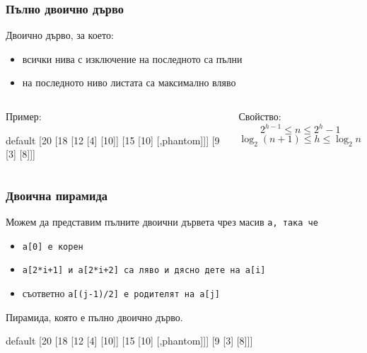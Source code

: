 \documentclass[alsotrans,beameroptions={aspectratio=169}]{beamerswitch}
\newcommand{\samplebinheap}{\begin{forest}
    default [20 [18 [12 [4] [10]] [15 [10] [,phantom]]] [9 [3] [8]]]
\end{forest}}
\begin{document}
\begin{frame}
  \frametitle{Пълно двоично дърво}

  \begin{definition}
    Двоично дърво, за което:
    \begin{itemize}
    \item всички нива с изключение на последното са пълни
    \item на последното ниво листата са максимално вляво
    \end{itemize}
  \end{definition}
  \pause
  \begin{columns}[t,onlytextwidth]
    \begin{column}{0.5\textwidth}
      Пример:\vspace{-3ex}
      \small
      \begin{center}
        \samplebinheap
      \end{center}
    \end{column}
    \begin{column}{0.5\textwidth}
      \pause
      Свойство:
      \begin{equation*}
        2^{h-1} \leq n \leq 2^h-1
      \end{equation*}
      \pause
      \begin{equation*}
        \log_2(n+1) \leq h \leq \log_2 n + 1
      \end{equation*}
    \end{column}
  \end{columns}
\end{frame}

\begin{frame}
  \frametitle{Двоична пирамида}

  \footnotesize
  Можем да представим пълните двоични дървета чрез масив \tt a, така че
  \begin{itemize}[<+->]
  \item \tt{a[0]} е корен
  \item \tt{a[2*i+1]} и \tt{a[2*i+2]} са ляво и дясно дете на \tt{a[i]}
  \item съответно \tt{a[(j-1)/2]} е родителят на \tt{a[j]}
  \end{itemize}
  \onslide<+->
  \begin{definition}
    Пирамида, която е пълно двоично дърво.
  \end{definition}
  \onslide<+->
  \begin{center}
    \samplebinheap
  \end{center}
\end{frame}
\end{document}
